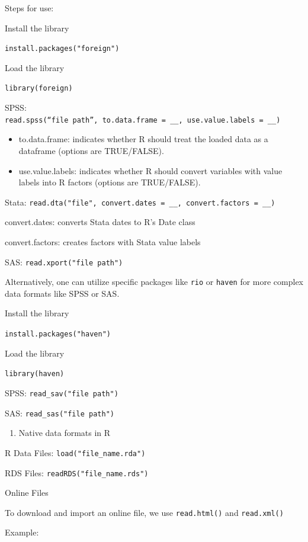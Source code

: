 \documentclass[
  letterpaper,
  DIV=11,
  numbers=noendperiod]{scrreprt}
\providecommand{\tightlist}{%
  \setlength{\itemsep}{0pt}\setlength{\parskip}{0pt}}\usepackage{longtable,booktabs,array}
\begin{document}
Steps for use:

Install the library

\texttt{install.packages("foreign")}

Load the library

\texttt{library(foreign)}

SPSS:
\texttt{read.spss(“file\ path”,\ to.data.frame\ =\ \_\_,\ use.value.labels\ =\ \_\_)}

\begin{itemize}
\item
  to.data.frame: indicates whether R should treat the loaded data as a
  dataframe (options are TRUE/FALSE).
\item
  use.value.labels: indicates whether R should convert variables with
  value labels into R factors (options are TRUE/FALSE).
\end{itemize}

Stata:
\texttt{read.dta("file",\ convert.dates\ =\ \_\_,\ convert.factors\ =\ \_\_)}

convert.dates: converts Stata dates to R's Date class

convert.factors: creates factors with Stata value labels

SAS: \texttt{read.xport("file\ path")}

Alternatively, one can utilize specific packages like \texttt{rio} or
\texttt{haven} for more complex data formats like SPSS or SAS.

Install the library

\texttt{install.packages("haven")}

Load the library

\texttt{library(haven)}

SPSS: \texttt{read\_sav("file\ path")}

SAS: \texttt{read\_sas("file\ path")}

\begin{enumerate}
\def\labelenumi{\alph{enumi}.}
\setcounter{enumi}{2}
\tightlist
\item
  Native data formats in R
\end{enumerate}

R Data Files: \texttt{load("file\_name.rda")}

RDS Files: \texttt{readRDS("file\_name.rds")}

Online Files

To download and import an online file, we use \texttt{read.html()} and
\texttt{read.xml()}

Example:
\end{document}
